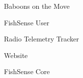 \item Baboons on the Move
\item FishSense User
\item Radio Telemetry Tracker
\item Website
\item FishSense Core
